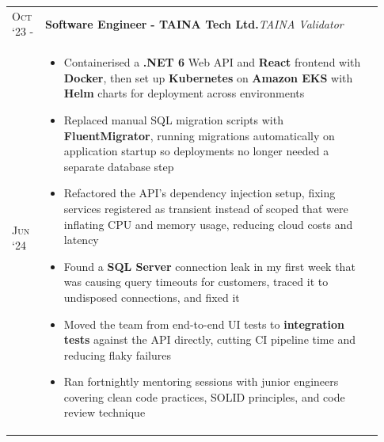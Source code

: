 \documentclass[a4paper,10pt]{extarticle} %
\begin{document}
{\begin{longtable}{>{\raggedright\arraybackslash}p{0.08\linewidth} | >{\raggedright\arraybackslash}p{0.85\linewidth}}
\newpage
\textsc{Oct ‘23 -} & \textbf{Software Engineer} \textbf{ - TAINA Tech Ltd.}\hfill\textit{TAINA Validator}\\
\textsc{Jun ‘24} & \parbox[t]{\linewidth}{
\vspace{-7pt}
\begin{itemize}[leftmargin=*, itemsep=3pt]
    \item Containerised a \textbf{.NET 6} Web API and \textbf{React} frontend with \textbf{Docker}, then set up \textbf{Kubernetes} on \textbf{Amazon EKS} with \textbf{Helm} charts for deployment across environments
    \item Replaced manual SQL migration scripts with \textbf{FluentMigrator}, running migrations automatically on application startup so deployments no longer needed a separate database step
    \item Refactored the API’s dependency injection setup, fixing services registered as transient instead of scoped that were inflating CPU and memory usage, reducing cloud costs and latency
    \item Found a \textbf{SQL Server} connection leak in my first week that was causing query timeouts for customers, traced it to undisposed connections, and fixed it
    \item Moved the team from end-to-end UI tests to \textbf{integration tests} against the API directly, cutting CI pipeline time and reducing flaky failures
    \item Ran fortnightly mentoring sessions with junior engineers covering clean code practices, SOLID principles, and code review technique
\end{itemize}
}\\

\end{longtable}

}
\end{document}
